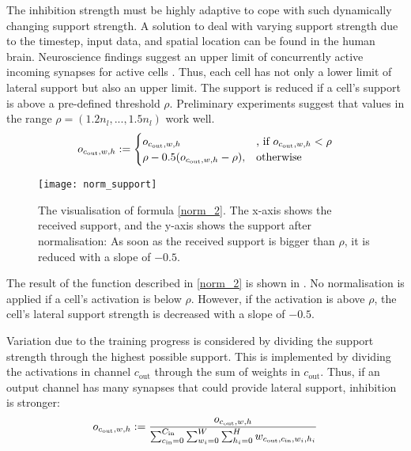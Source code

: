 The inhibition strength must be highly adaptive to cope with such dynamically changing support strength.
A solution to deal with varying support strength due to the timestep, input data, and spatial location can be found in the human brain.
Neuroscience findings suggest an upper limit of concurrently active incoming synapses for active cells . Thus, each cell has not only a lower limit of lateral support but also an upper limit.
The support is reduced if a cell's support is above a pre-defined threshold $\rho$.
Preliminary experiments suggest that values in the range $\rho = (1.2n_l, ..., 1.5n_l)$ work well.
%
\begin{align}\eqlbl{norm_2}
	o_{c_{\text{out}},w,h} := \begin{cases}
      		o_{c_{\text{out}},w,h} & \text{, if } o_{c_{\text{out}},w,h} < \rho \\
      		\rho - 0.5(o_{c_{\text{out}},w,h} - \rho), & \text{otherwise}
    	\end{cases}
\end{align}
%
\begin{figure}[h]
    \centering
    \texttt{[image: norm\_support]}
    \caption[Inhibition for too many activated cells]{The visualisation of formula \eqref{norm_2}. The x-axis shows the received support, and the y-axis shows the support after normalisation: As soon as the received support is bigger than $\rho$, it is reduced with a slope of $-0.5$.}
\end{figure}
The result of the function described in \eqref{norm_2} is shown in . No normalisation is applied if a cell's activation is below $\rho$. However, if the activation is above $\rho$, the cell's lateral support strength is decreased with a slope of $-0.5$.

Variation due to the training progress is considered by dividing the support strength through the highest possible support. This is implemented by dividing the activations in channel $c_{\text{out}}$ through the sum of weights in $c_{\text{out}}$. Thus, if an output channel has many synapses that could provide lateral support, inhibition is stronger:
%
\begin{align}\eqlbl{norm_1}
    o_{c_{\text{out}},w,h} := \frac{o_{c_{\text{out}},w,h}}{\sum_{c_{\text{in}}=0}^{C_{\text{in}}} \sum_{w_i=0}^{W} \sum_{h_i=0}^{H} w_{c_{\text{out}}, c_{\text{in}},w_i,h_i}}
\end{align}
%

